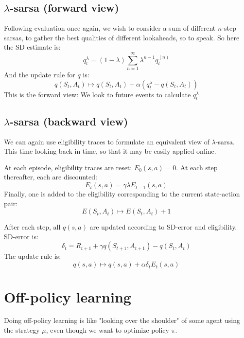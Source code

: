 \documentclass[12pt, a4paper]{article}
\numberwithin{equation}{section}
\begin{document}
\subsection{$\lambda$-sarsa (forward view)}
Following evaluation once again, we wish to consider a sum of different $n$-step sarsas, to gather the best qualities of different lookaheads, so to speak. So here the SD estimate is:
\begin{equation}
q_t^\lambda=(1-\lambda)\sum_{n=1}^\infty\lambda^{n-1}q_t^{(n)}
\end{equation}
And the update rule for $q$ is:
\begin{equation}
q(S_t,A_t)\mapsto q(S_t,A_t)+\alpha(q_t^\lambda-q(S_t,A_t))
\end{equation}
This is the forward view: We look to future events to calculate $q_t^\lambda$.

\subsection{$\lambda$-sarsa (backward view)}
We can again use eligibility traces to formulate an equivalent view of $\lambda$-sarsa. This time looking back in time, so that it may be easily applied online.

At each episode, eligibility traces are reset: $E_0(s,a)=0$. At each step thereafter, each are discounted:
\begin{equation}
E_t(s,a)=\gamma\lambda E_{t-1}(s,a)
\end{equation}
Finally, one is added to the eligibility corresponding to the current state-action pair:
\begin{equation}
E(S_t,A_t)\mapsto E(S_t,A_t)+1
\end{equation}

After each step, all $q(s,a)$ are updated according to SD-error and eligibility. SD-error is:
\begin{equation}
\delta_t=R_{t+1}+\gamma q(S_{t+1},A_{t+1})-q(S_t,A_t)
\end{equation}
The update rule is:
\begin{equation}
q(s,a)\mapsto q(s,a)+\alpha\delta_t E_t(s,a)
\end{equation}

\section{Off-policy learning}
Doing off-policy learning is like "looking over the shoulder" of some agent using the strategy $\mu$, even though we want to optimize policy $\pi$.
\end{document}
